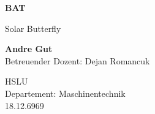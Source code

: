 \begin{titlepage}
    \begin{center}
        \vspace*{1cm}

        \Huge
        \textbf{BAT}

        \vspace{0.5cm}
        \LARGE
        Solar Butterfly

        \vspace{1.5cm}

        \textbf{Andre Gut}\\
        \Large
        Betreuender Dozent: Dejan Romancuk

        \vfill
        \begin{center}
        \end{center}

        \vspace{4cm}

        \Large
        HSLU\\
        Departement: Maschinentechnik\\
        18.12.6969

    \end{center}
\end{titlepage}
